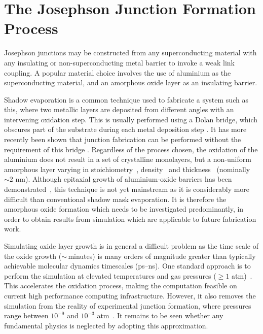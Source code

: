 \section{The Josephson Junction Formation Process}

Josephson junctions may be constructed from any superconducting material with any insulating or non-superconducting metal barrier to invoke a weak link coupling.
A popular material choice involves the use of aluminium as the superconducting material, and an amorphous oxide layer as an insulating barrier.

Shadow evaporation is a common technique used to fabricate a system such as this, where two metallic layers are deposited from different angles with an intervening oxidation step.
This is usually performed using a Dolan bridge, which obscures part of the substrate during each metal deposition step \cite{Dolan1977}.
It has more recently been shown that junction fabrication can be performed without the requirement of this bridge \cite{Lecocq2011}.
Regardless of the process chosen, the oxidation of the aluminium does not result in a set of crystalline monolayers, but a non-uniform amorphous layer varying in stoichiometry~\cite{Park2002, Tan2005}, density~\cite{Barbour1998} and thickness~\cite{Gloos2003,Aref2014,Zeng2014} (nominally $\sim\!2$ nm).  Although epitaxial growth of aluminium-oxide barriers has been demonstrated~\cite{Oh2006}, this technique is not yet mainstream as it is considerably more difficult than conventional shadow mask evaporation.
It is therefore the amorphous oxide formation which needs to be investigated predominantly, in order to obtain results from simulation which are applicable to future fabrication work.

Simulating oxide layer growth is in general a difficult problem as the time scale of the oxide growth ($\sim\,$minutes) is many orders of magnitude greater than typically achievable molecular dynamics timescales (ps--ns).
One standard approach is to perform the simulation at elevated temperatures and gas pressures ($\ge 1$ atm)~\cite{Campbell1999, Zhou2005, Hasnaoui2005}.
This accelerates the oxidation process, making the computation feasible on current high performance computing infrastructure.
However, it also removes the simulation from the reality of experimental junction formation, where pressures range between $10^{-9}$ and $10^{-3}$ atm~\cite{Morohashi1987, Kohlstedt1993, Jeurgens2002}.
It remains to be seen whether any fundamental physics is neglected by adopting this approximation.

